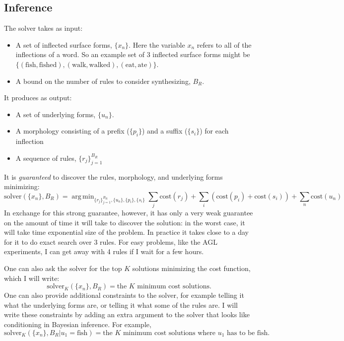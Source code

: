 \documentclass{article}
\DeclareMathOperator*{\argmin}{arg\,min}
\begin{document}
\pagebreak
\subsection{Inference}

The solver takes as input:
\begin{itemize}
\item A set of inflected surface forms, $\{x_n\}$. Here the variable $x_n$ refers to all of the inflections of a word. So an example set of 3 inflected surface forms might be $\{(\text{fish},\text{fished}), (\text{walk},\text{walked}), (\text{eat},\text{ate})\}$.
\item A bound on the number of rules to consider synthesizing, $B_R$.
\end{itemize}
It produces as output:
\begin{itemize}
\item A set of underlying forms, $\{u_n\}$.
\item A morphology consisting of a prefix ($\{p_i\}$) and a suffix ($\{s_i\}$)  for each inflection
\item  A sequence of rules, $\{r_j\}_{j = 1}^{B_R}$
\end{itemize}
It is \emph{guaranteed} to discover the rules, morphology, and underlying forms minimizing:
\begin{equation}
  \text{solver}(\{x_n\},B_R) = \argmin_{\{r_j\}_{j = 1}^{B_R}, \{u_n\}, \{p_i\}, \{s_i\}} \sum_j \text{cost}(r_j) + \sum_i (\text{cost}(p_i) + \text{cost}(s_i) ) + \sum_n \text{cost}(u_n)
\end{equation}
In exchange for this strong guarantee, however, it has only a very
weak guarantee on the amount of time it will take to discover the
solution: in the worst case, it will take time exponential size of the
problem. In practice it takes close to a day for it to do exact search over 3 rules.
For easy problems, like the AGL experiments, I can get away with 4 rules if I wait for a few hours.

One can also ask the solver for the top $K$ solutions minimizing the cost function, which I will write:
\begin{equation}
  \text{solver}_K(\{x_n\},B_R) = \text{the }K\text{ minimum cost solutions.}
\end{equation}
One can also provide additional constraints to the solver, for example telling it what the underlying forms are,
or telling it what some of the rules are. I will write these constraints by adding an extra argument to the solver
that looks like conditioning in Bayesian inference. For example,
\begin{equation}
  \text{solver}_K(\{x_n\},B_R|u_1 = \text{fish}) = \text{the }K\text{ minimum cost solutions where }u_1\text{ has to be fish.}
  \end{equation}
\end{document}
